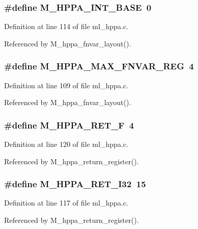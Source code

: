 \subsubsection{\setlength{\rightskip}{0pt plus 5cm}\#define M\_\-HPPA\_\-INT\_\-BASE~0}\label{ml__hppa_8c_6d665d3c7828a658c43146145dd145b7}




Definition at line 114 of file ml\_\-hppa.c.

Referenced by M\_\-hppa\_\-fnvar\_\-layout().
\subsubsection{\setlength{\rightskip}{0pt plus 5cm}\#define M\_\-HPPA\_\-MAX\_\-FNVAR\_\-REG~4}\label{ml__hppa_8c_65652aed2c01815b5f1d1209ac59ba3e}




Definition at line 109 of file ml\_\-hppa.c.

Referenced by M\_\-hppa\_\-fnvar\_\-layout().
\subsubsection{\setlength{\rightskip}{0pt plus 5cm}\#define M\_\-HPPA\_\-RET\_\-F~4}\label{ml__hppa_8c_eb187738b3ef316b792b6e2fae57877e}




Definition at line 120 of file ml\_\-hppa.c.

Referenced by M\_\-hppa\_\-return\_\-register().
\subsubsection{\setlength{\rightskip}{0pt plus 5cm}\#define M\_\-HPPA\_\-RET\_\-I32~15}\label{ml__hppa_8c_0287dee1b21616306bd1fb9e5ac8130f}




Definition at line 117 of file ml\_\-hppa.c.

Referenced by M\_\-hppa\_\-return\_\-register().
